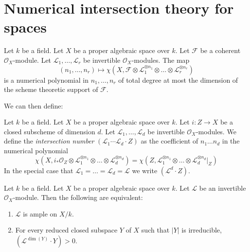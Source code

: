 \section{Numerical intersection theory for spaces}
\begin{lemma}\label{tag:0DN4}
Let $k$ be a field. Let $X$ be a proper algebraic space over $k$.
Let $\mathcal{F}$ be a coherent $\mathcal{O}_X$-module. Let
$\mathcal{L}_1, \ldots, \mathcal{L}_r$ be invertible $\mathcal{O}_X$-modules.
The map
$$
(n_1, \ldots, n_r) \longmapsto
\chi(X, \mathcal{F} \otimes
\mathcal{L}_1^{\otimes n_1} \otimes \ldots \otimes
\mathcal{L}_r^{\otimes n_r})
$$
is a numerical polynomial in $n_1, \ldots, n_r$ of total degree at
most the dimension of the scheme theoretic support of $\mathcal{F}$.
\end{lemma}
We can then define:
\begin{definition}\label{tag:0BEP}
Let $k$ be a field. Let $X$ be a proper algebraic space over $k$. Let
$i : Z \to X$ be a closed subscheme of dimension $d$. Let
$\mathcal{L}_1, \ldots, \mathcal{L}_d$ be invertible
$\mathcal{O}_X$-modules. We define the {\it intersection number}
$(\mathcal{L}_1 \cdots \mathcal{L}_d \cdot Z)$
as the coefficient of $n_1 \ldots n_d$ in the numerical polynomial
$$
\chi(X, i_*\mathcal{O}_Z \otimes \mathcal{L}_1^{\otimes n_1} \otimes
\ldots \otimes \mathcal{L}_d^{\otimes n_d}) =
\chi(Z, \mathcal{L}_1^{\otimes n_1} \otimes
\ldots \otimes \mathcal{L}_d^{\otimes n_d}|_Z)
$$
In the special
case that $\mathcal{L}_1 = \ldots = \mathcal{L}_d = \mathcal{L}$
we write $(\mathcal{L}^d \cdot Z)$.
\end{definition}


\begin{theorem}
  Let $k$ be a field. Let $X$ be a proper algebraic space over $k$. Let
  $\mathcal{L}$ be an invertible $\mathcal{O}_X$-module. Then the following are
  equivalent:
  \begin{enumerate}
    \item $\mathcal{L}$ is ample on $X/k$.
    \item For every reduced closed subspace $Y$ of $X$ such that $\lvert Y
      \rvert$ is irreducible, $(\mathcal{L}^{\dim(Y)} \cdot Y) > 0$.
  \end{enumerate}
\end{theorem}





